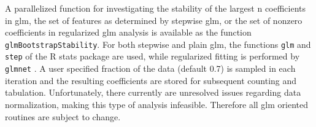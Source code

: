 A parallelized function for investigating the stability of the largest n coefficients in \gls{glm}, the set of features as determined by stepwise \gls{glm}, or the set of nonzero coefficients in regularized \gls{glm} analysis is available as the function \texttt{glmBootstrapStability}. For both stepwise and plain \gls{glm}, the functions \texttt{glm} and \texttt{step} of the R stats package are used, while regularized fitting is performed by \texttt{glmnet} \citep{Friedman2010a}. A user specified fraction of the data (default 0.7) is sampled in each iteration and the resulting coefficients are stored for subsequent counting and tabulation. Unfortunately, there currently are unresolved issues regarding data normalization, making this type of analysis infeasible. Therefore all \gls{glm} oriented routines are subject to change.

